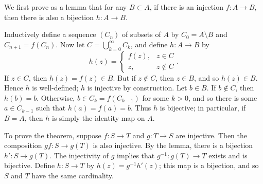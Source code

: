 \documentclass[12pt]{article}
\begin{document}
We first prove as a lemma that for any $B\subset A$, if there is an
injection $f:A\to B$, then there is also a bijection
$h:A\to B$.

Inductively define a sequence $(C_n)$ of subsets of $A$ by $C_0=A\setminus B$
and $C_{n+1}=f(C_n)$.  
Now let $C=\bigcup_{k=0}^\infty C_k$, and define $h:A\rightarrow B$ by
\[h(z)=\begin{cases}
f(z), & z\in C \\
z,    & z\notin C
\end{cases}.\]
If $z\in C$, then $h(z)=f(z)\in B$.  But if $z\notin C$, then $z\in B$, and so $h(z)\in B$.  Hence $h$ is well-defined; $h$ is
injective by construction.  Let $b\in B$.  If $b\notin C$, then
$h(b)=b$.  Otherwise, $b\in C_k=f(C_{k-1})$ for some $k>0$, and
so there is some $a\in C_{k-1}$ such that $h(a)=f(a)=b$.  Thus $h$
is bijective; in particular, if $B=A$, then $h$ is simply the identity
map on $A$.

To prove the theorem, suppose $f:S\to T$ and $g:T\to S$
are injective.  Then the composition $gf:S\to g(T)$ is also
injective.  By the lemma, there is a bijection $h':S\to g(T)$.
The injectivity of $g$ implies that $g^{-1}:g(T)\to T$ exists
and is bijective.  Define $h:S\to T$ by $h(z)=g^{-1}h'(z)$; this
map is a bijection, and so $S$ and $T$ have the same cardinality.
\end{document}
